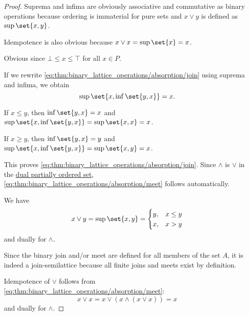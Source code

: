 \begin{proof}
   Suprema and infima are obviously associative and commutative as binary operations because ordering is immaterial for pure sets and \( x \vee y \) is defined as \( \sup\set{ x, y } \).

  Idempotence is also obvious because \( x \vee x = \sup\set{ x } = x \).

   Obvious since \( \bot \leq x \leq \top \) for all \( x \in P \).

   If we rewrite \eqref{eq:thm:binary_lattice_operations/absorption/join} using suprema and infima, we obtain
  \begin{equation*}
    \sup\set{ x, \inf\set{ y, x } } = x.
  \end{equation*}

  If \( x \leq y \), then \( \inf\set{ y, x } = x \) and \( \sup\set{ x, \inf\set{ y, x } } = \sup\set{ x, x } = x \).

  If \( x \geq y \), then \( \inf\set{ y, x } = y \) and \( \sup\set{ x, \inf\set{ y, x } } = \sup\set{ x, y } = x \).

  This proves \eqref{eq:thm:binary_lattice_operations/absorption/join}. Since \( \wedge \) is \( \vee \) in the \hyperref[def:preordered_set/duality]{dual partially ordered set}, \eqref{eq:thm:binary_lattice_operations/absorption/meet} follows automatically.

   We have
  \begin{equation*}
    x \vee y
    =
    \sup\set{ x, y }
    =
    \begin{cases}
      y, &x \leq y \\
      x, &x > y
    \end{cases}
  \end{equation*}
  and dually for \( \wedge \).

   Since the binary join and/or meet are defined for all members of the set \( A \), it is indeed a join-semilattice because all finite joins and meets exist by definition.

  Idempotence of \( \vee \) follows from \eqref{eq:thm:binary_lattice_operations/absorption/meet}:
  \begin{equation*}
    x \vee x = x \vee (x \wedge (x \vee x)) = x
  \end{equation*}
  and dually for \( \wedge \).
\end{proof}

